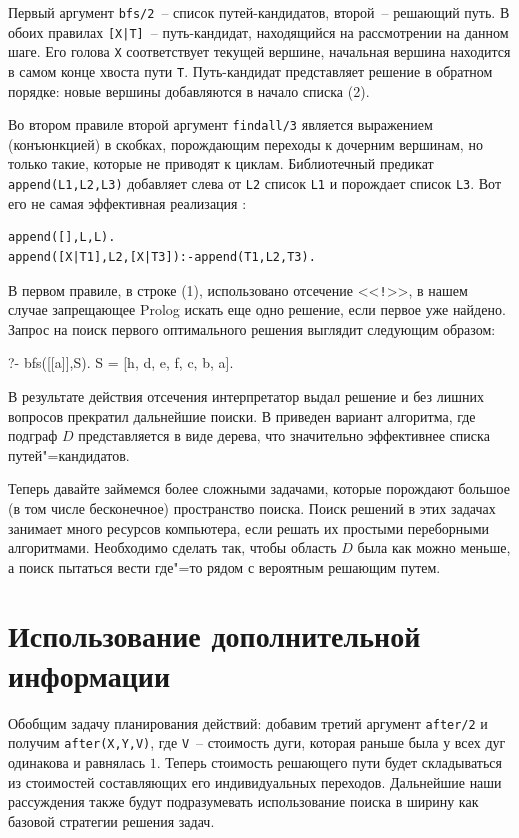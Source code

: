 \documentclass[a4paper,14pt, openany, twoside, draft]{extbook} %
\begin{document}
Первый аргумент \texttt{bfs/2}~-- список путей-кандидатов, второй~-- решающий путь.  В обоих правилах \texttt{[X|T]}~-- путь-кандидат, находящийся на рассмотрении на данном шаге. Его голова \texttt{X} соответствует текущей вершине, начальная вершина находится в самом конце хвоста пути \texttt{T}.  Путь-кандидат представляет решение в обратном порядке: новые вершины добавляются в начало списка (2).

Во втором правиле второй аргумент \texttt{findall/3} является выражением (конъюнкцией) в скобках, порождающим переходы к дочерним вершинам, но только такие, которые не приводят к циклам.  Библиотечный предикат \texttt{append(L1,L2,L3)} добавляет слева от \texttt{L2} список \texttt{L1} и порождает список \texttt{L3}.  Вот его не самая эффективная реализация \cite{Bratko}:

\begin{verbatim}
append([],L,L).
append([X|T1],L2,[X|T3]):-append(T1,L2,T3).
\end{verbatim}


В первом правиле, в строке (1), использовано отсечение <<\texttt{!}>>, в нашем случае запрещающее Prolog искать еще одно решение, если первое уже найдено.  Запрос на поиск первого оптимального решения выглядит следующим образом:

\begin{proexp}
?- bfs([[a]],S).
S = [h, d, e, f, c, b, a].
\end{proexp}

\noindent В результате действия отсечения интерпретатор выдал решение и без лишних вопросов прекратил дальнейшие поиски.  В \cite{Bratko} приведен вариант алгоритма, где подграф $D$ представляется в виде дерева, что значительно эффективнее списка путей"=кандидатов.

Теперь давайте займемся более сложными задачами, которые порождают большое (в том числе бесконечное) пространство поиска.  Поиск решений в этих задачах занимает много ресурсов компьютера, если решать их простыми переборными алгоритмами.  Необходимо сделать так, чтобы область $D$ была как можно меньше, а поиск пытаться вести где"=то рядом с вероятным решающим путем.

\section{Использование дополнительной информации}
\label{sec:informedsearch}

Обобщим задачу планирования действий: добавим третий аргумент \texttt{after/2} и получим \texttt{after(X,Y,V)}, где \texttt{V}~-- стоимость дуги, которая раньше была у всех дуг одинакова и равнялась $1$.   Теперь стоимость решающего пути будет складываться из стоимостей составляющих его индивидуальных переходов.  Дальнейшие наши рассуждения также будут подразумевать использование поиска в ширину как базовой стратегии решения задач.
\end{document}
